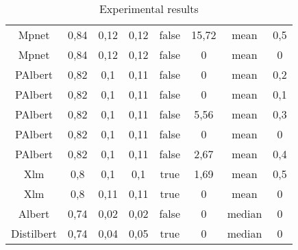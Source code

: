 \documentclass[\main/main.tex]{subfiles}
\begin{document}
\begin{table}[ht]
{\begin{tabular}{||c|c|c|c|c|c|c|c||}
\rowcolor{gray} Mpnet                 & 0,84 & 0,12  & 0,12  & false & 15,72 & mean   & 0,5 \\
Mpnet                 & 0,84 & 0,12  & 0,12  & false & 0     & mean   & 0   \\
PAlbert          & 0,82 & 0,1   & 0,11  & false & 0     & mean   & 0,2 \\
PAlbert          & 0,82 & 0,1   & 0,11  & false & 0     & mean   & 0,1 \\
PAlbert          & 0,82 & 0,1   & 0,11  & false & 5,56  & mean   & 0,3 \\
PAlbert          & 0,82 & 0,1   & 0,11  & false & 0     & mean   & 0   \\
PAlbert          & 0,82 & 0,1   & 0,11  & false & 2,67  & mean   & 0,4 \\
Xlm    & 0,8  & 0,1   & 0,1   & true  & 1,69  & mean   & 0,5 \\
Xlm    & 0,8  & 0,11  & 0,11  & true  & 0     & mean   & 0   \\
Albert                    & 0,74 & 0,02  & 0,02  & false & 0     & median & 0   \\
Distilbert & 0,74 & 0,04  & 0,05  & true  & 0     & median & 0   \\
\hline
\end{tabular}
}
\caption{Experimental results}
\label{tab:experimental_results_complete}
\end{table}
\end{document}
